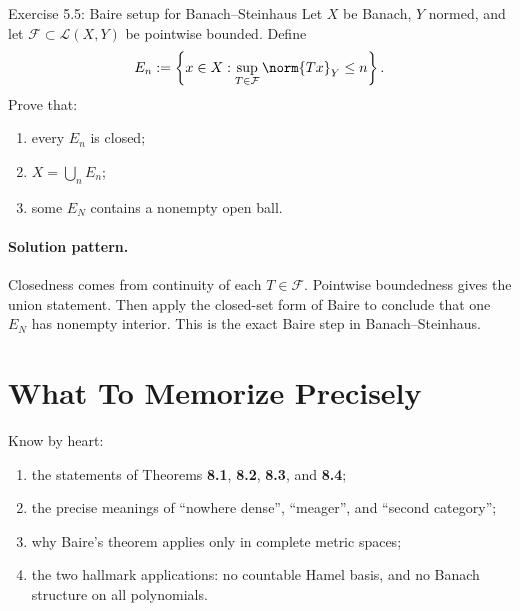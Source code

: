 \documentclass[header={Lecture 5 Exam Study Notes}]{study-note}
\begin{document}
\begin{exbox}{Exercise 5.5: Baire setup for Banach--Steinhaus}
Let $X$ be Banach, $Y$ normed, and let $\mathcal F\subset\mathcal L(X,Y)$ be pointwise bounded. Define
\[
E_n:=\left\{x\in X:\sup_{T\in\mathcal F}\norm{Tx}_Y\le n\right\}.
\]
Prove that:
\begin{enumerate}
\item every $E_n$ is closed;
\item $X=\bigcup_n E_n$;
\item some $E_N$ contains a nonempty open ball.
\end{enumerate}

\paragraph{Solution pattern.}
Closedness comes from continuity of each $T\in\mathcal F$. Pointwise boundedness gives the union statement. Then apply the closed-set form of Baire to conclude that one $E_N$ has nonempty interior. This is the exact Baire step in Banach--Steinhaus.
\end{exbox}

\section{What To Memorize Precisely}

\begin{focusbox}
Know by heart:
\begin{enumerate}
\item the statements of Theorems \textbf{8.1}, \textbf{8.2}, \textbf{8.3}, and \textbf{8.4};
\item the precise meanings of ``nowhere dense'', ``meager'', and ``second category'';
\item why Baire's theorem applies only in complete metric spaces;
\item the two hallmark applications: no countable Hamel basis, and no Banach structure on all polynomials.
\end{enumerate}
\end{focusbox}
\end{document}

